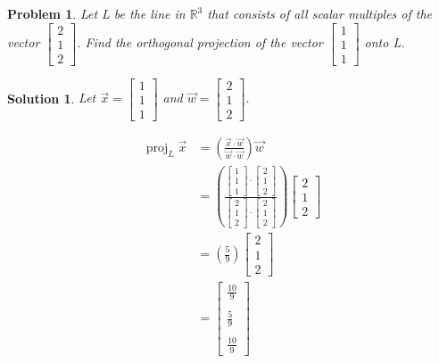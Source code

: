 \documentclass{article}
\newtheorem{problem}{Problem}
\newtheorem*{solution}{Solution}
\DeclareMathOperator{\proj}{proj}
\newcommand{\vectorproj}[2][]{\proj_{#1}#2}
\begin{document}
\begin{problem}
Let L be the line in $\mathbb{R}^3$ that consists of all scalar multiples of the vector $\begin{bmatrix} 2 \\ 1 \\ 2 \end{bmatrix}$. Find the orthogonal projection of the vector $\begin{bmatrix} 1 \\ 1 \\ 1 \end{bmatrix}$ onto L.
\end{problem}

\begin{solution}
Let $\vec{x} = \begin{bmatrix} 1 \\ 1 \\ 1 \end{bmatrix}$ and $\vec{w} = \begin{bmatrix} 2 \\ 1 \\ 2 \end{bmatrix}$.

\begin{align*}
\vectorproj[L]{\vec{x}} &= \left( \frac{\vec{x} \cdot \vec{w}}{\vec{w} \cdot \vec{w}} \right) \vec{w} \\
&= \left( \frac{\begin{bmatrix}1 \\ 1 \\ 1 \end{bmatrix} \cdot \begin{bmatrix} 2 \\ 1 \\ 2 \end{bmatrix}}{\begin{bmatrix} 2 \\ 1 \\ 2 \end{bmatrix} \cdot \begin{bmatrix} 2 \\ 1 \\ 2 \end{bmatrix}} \right) \begin{bmatrix} 2 \\ 1 \\ 2 \end{bmatrix} \\
&= \left( \frac{5}{9} \right) \begin{bmatrix} 2 \\ 1 \\ 2 \end{bmatrix} \\
&= \begin{bmatrix} \frac{10}{9} \\ \\  \frac{5}{9} \\ \\ \frac{10}{9} \end{bmatrix}
\end{align*}


\end{solution}
\end{document}
